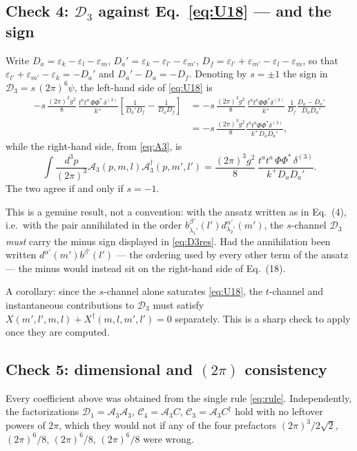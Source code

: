 \documentclass[11pt]{article}
\newcommand{\eps}{\varepsilon}
\newcommand{\dg}{\dagger}
\newcommand{\ip}[1]{\int\!\frac{d^{3}#1}{(2\pi)^{3}}}
\newcommand{\dthree}{\delta^{(3)}}
\newcommand{\Ph}{\Phi}
\begin{document}
\subsection{Check 4: $\mathcal D_3$ against Eq.~\eqref{eq:U18} --- and the sign}
Write $D_{a}=\eps_{k}-\eps_{l}-\eps_{m}$, $D_{a}'=\eps_{k}-\eps_{l'}-\eps_{m'}$,
$D_{f}=\eps_{l'}+\eps_{m'}-\eps_{l}-\eps_{m}$, so that
$\eps_{l'}+\eps_{m'}-\eps_{k}=-D_{a}'$ and $D_{a}'-D_{a}=-D_{f}$. Denoting by $s=\pm1$ the sign
in $\mathcal D_{3}=s\,(2\pi)^{6}\psi$, the left-hand side of \eqref{eq:U18} is
\begin{align}
-s\,\frac{(2\pi)^{3}g^{2}}{8}\,\frac{t^{a}t^{a}\,\Ph\Ph^{*}\,\dthree}{k^{+}}
\left[\frac{1}{D_{a}'D_{f}}-\frac{1}{D_{a}D_{f}}\right]
&=-s\,\frac{(2\pi)^{3}g^{2}}{8}\,\frac{t^{a}t^{a}\Ph\Ph^{*}\dthree}{k^{+}}\,
\frac{1}{D_{f}}\frac{D_{a}-D_{a}'}{D_{a}D_{a}'}
\nonumber\\
&=-s\,\frac{(2\pi)^{3}g^{2}}{8}\frac{t^{a}t^{a}\Ph\Ph^{*}\dthree}{k^{+}D_{a}D_{a}'},
\end{align}
while the right-hand side, from \eqref{eq:A3}, is
\begin{equation}
\ip{p}\mathcal A_{3}(p,m,l)\mathcal A_{3}^{\dg}(p,m',l')
=\frac{(2\pi)^{3}g^{2}}{8}\,\frac{t^{a}t^{a}\,\Ph\Ph^{*}\,\dthree}{k^{+}D_{a}D_{a}'} .
\end{equation}
The two agree if and only if $s=-1$. \checkmark

\begin{res}
This is a genuine result, not a convention: with the ansatz written as in Eq.~(4), i.e.\ with the
pair annihilated in the order $b^{\beta'}_{\lambda_1'}(l')d^{\alpha'}_{\lambda_2'}(m')$, the
$s$-channel $\mathcal D_3$ \emph{must} carry the minus sign displayed in \eqref{eq:D3res}. Had
the annihilation been written $d^{\alpha'}(m')b^{\beta'}(l')$ --- the ordering used by every other
term of the ansatz --- the minus would instead sit on the right-hand side of Eq.~(18).
\end{res}

\noindent
A corollary: since the $s$-channel alone saturates \eqref{eq:U18}, the $t$-channel and
instantaneous contributions to $\mathcal D_3$ must satisfy
$X(m',l',m,l)+X^{\dg}(m,l,m',l')=0$ separately. This is a sharp check to apply once they are
computed.

\subsection{Check 5: dimensional and $(2\pi)$ consistency}
Every coefficient above was obtained from the single rule \eqref{eq:rule}. Independently, the
factorizations $\mathcal D_{1}=\mathcal A_3\mathcal A_3$, $\mathcal C_{4}=\mathcal A_3 C$,
$\mathcal C_{3}=\mathcal A_3C^{\dg}$ hold with no leftover powers of $2\pi$, which they would not
if any of the four prefactors $(2\pi)^{3}/2\sqrt2$, $(2\pi)^{6}/8$, $(2\pi)^{6}/8$,
$(2\pi)^{6}/8$ were wrong. \checkmark
\end{document}
